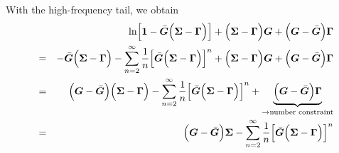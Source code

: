 \documentclass[11pt,a4paper]{report}
\begin{document}
With the high-frequency tail, we obtain
\begin{eqnarray}
&&\ln\Bigl[\mat{1}-\bar{\mat{G}}\Bigl(\mat{\Sigma}-\mat{\Gamma}\Bigr)\Bigr]
+\Bigl(\mat{\Sigma}-\mat{\Gamma}\Bigr)\mat{G}
+\Bigl(\mat{G}-\bar{\mat{G}}\Bigr)\mat{\Gamma}
%
\nonumber\\
&=&-\bar{\mat{G}}\Bigl(\mat{\Sigma}-\mat{\Gamma}\Bigr)
-\sum_{n=2}^\infty\frac{1}{n}
\Bigl[\bar{\mat{G}}\Bigl(\mat{\Sigma}-\mat{\Gamma}\Bigr)\Bigr]^n
+\Bigl(\mat{\Sigma}-\mat{\Gamma}\Bigr)\mat{G}
+\Bigl(\mat{G}-\bar{\mat{G}}\Bigr)\mat{\Gamma}
%
\nonumber\\
&=&\Bigl(\mat{G}-\bar{\mat{G}}\Bigr)
\Bigl(\mat{\Sigma}-\mat{\Gamma}\Bigr)
-\sum_{n=2}^\infty\frac{1}{n}
\Bigl[\bar{\mat{G}}\Bigl(\mat{\Sigma}-\mat{\Gamma}\Bigr)\Bigr]^n
+\underbrace{\Bigl(\mat{G}-\bar{\mat{G}}\Bigr)\mat{\Gamma}}
_{\rightarrow\text{number constraint}}
%
\nonumber\\
&=&\Bigl(\mat{G}-\bar{\mat{G}}\Bigr)\mat{\Sigma}
-\sum_{n=2}^\infty\frac{1}{n}
\Bigl[\bar{\mat{G}}\Bigl(\mat{\Sigma}-\mat{\Gamma}\Bigr)\Bigr]^n
\label{eq:startingpointmatsubara}
\end{eqnarray}
\end{document}
